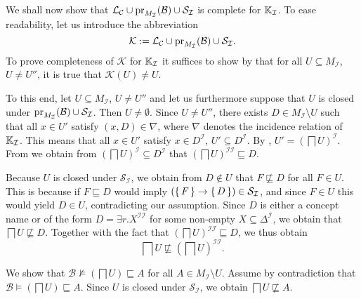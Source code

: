 \begin{Proof}
  We shall now show that $\mathcal{L}_{\mathcal{C}} \cup
  \operatorname{pr}_{M_{\mathcal{I}}}(\mathcal{B}) \cup \mathcal{S}_{\mathcal{I}}$ is complete for ${\mathbb{K}}_{\mathcal{I}}$.  To ease readability, let us introduce the abbreviation
  \begin{equation*}
    \mathcal{K} := \mathcal{L}_{\mathcal{C}} \cup \operatorname{pr}_{M_{\mathcal{I}}}(\mathcal{B}) \cup
    \mathcal{S}_{\mathcal{I}}.
  \end{equation*}
  To prove completeness of $\mathcal{K}$ for ${\mathbb{K}}_{\mathcal{I}}$ it suffices to show by
   that for all $U \subseteq M_{\mathcal{I}}$,
  $U \neq U''$, it is true that $\mathcal{K}(U) \neq U$.

  To this end, let $U \subseteq M_{\mathcal{I}}$, $U \neq U''$ and let us furthermore
  suppose that $U$ is closed under $\operatorname{pr}_{M_{\mathcal{I}}}(\mathcal{B}) \cup
  \mathcal{S}_{\mathcal{I}}$.  Then $U \neq \emptyset$.  Since $U \neq U''$, there exists
  $D \in M_{\mathcal{I}} \setminus U$ such that all $x \in U'$ satisfy $(x, D) \in
  \nabla$, where $\nabla$ denotes the incidence relation of ${\mathbb{K}}_{\mathcal{I}}$.  This
  means that all $x \in U'$ satisfy $x \in D^{\mathcal{I}}$, \ie $U' \subseteq
  D^{\mathcal{I}}$.  By , $U' = (\bigsqcap
  U)^{\mathcal{I}}$.  From  we obtain
  from $(\bigsqcap U)^{\mathcal{I}} \subseteq D^{\mathcal{I}}$ that $(\bigsqcap
  U)^{\mathcal{I}\mathcal{I}} \sqsubseteq D$.

  Because $U$ is closed under $\mathcal{S}_{\mathcal{I}}$, we obtain from $D \notin U$
  that $F \not\sqsubseteq D$ for all $F \in U$.  This is because if $F \sqsubseteq D$
  would imply $({\{\, F \,\}} \to {\ensuremath{\{\, D \,\}}}) \in \mathcal{S}_{\mathcal{I}}$, and since $F \in
  U$ this would yield $D \in U$, contradicting our assumption.  Since $D$ is either a
  concept name or of the form $D = \exists r. X^{\mathcal{I}\mathcal{I}}$ for some
  non-empty $X \subseteq \Delta^{\mathcal{I}}$, we obtain that $\bigsqcap U
  \not\sqsubseteq D$.  Together with the fact that $(\bigsqcap U)^{\mathcal{I}\mathcal{I}}
  \sqsubseteq D$, we thus obtain
  \begin{equation}
    \label{eq:31}
    \bigsqcap U \not\sqsubseteq (\bigsqcap U)^{\mathcal{I}\mathcal{I}}.
  \end{equation}

  We show that $\mathcal{B} \not\models (\bigsqcap U) \sqsubseteq A$ for all $A \in
  M_{\mathcal{I}} \setminus U$.  Assume by contradiction that $\mathcal{B} \models
  (\bigsqcap U) \sqsubseteq A$.  Since $U$ is closed under $\mathcal{S}_{\mathcal{I}}$, we
  obtain $\bigsqcap U \not\sqsubseteq A$.


\end{Proof}
